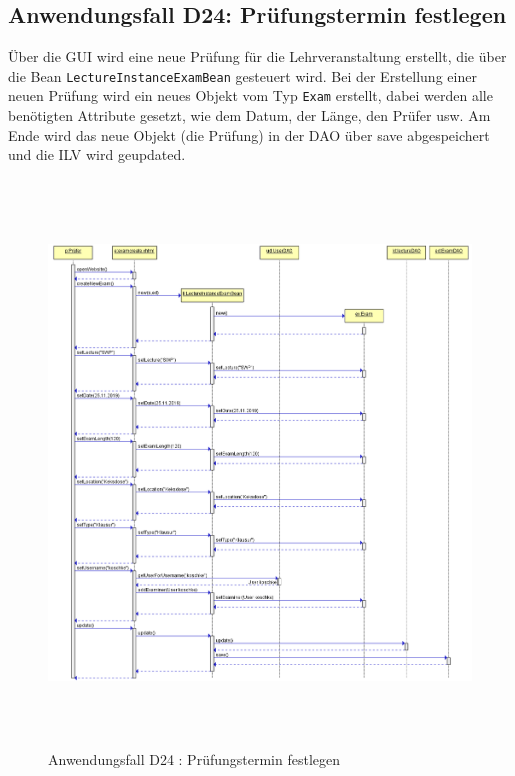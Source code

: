 \subsection{Anwendungsfall D24: Prüfungstermin festlegen}

Über die GUI wird eine neue Prüfung für die Lehrveranstaltung erstellt, die über die Bean \texttt {LectureInstanceExamBean} gesteuert wird. Bei der Erstellung einer neuen Prüfung wird ein neues Objekt vom Typ \texttt {Exam} erstellt, dabei werden alle benötigten Attribute gesetzt, wie dem Datum, der Länge, den Prüfer usw.
Am Ende wird das neue Objekt (die Prüfung) in der DAO über save abgespeichert und die ILV wird geupdated. 


\begin{figure}[H]
	\centering
	\includegraphics[width=\textwidth,height=15cm,keepaspectratio]{../UMLDiagramme/d24_pruefungstermineFestlegen.png}
	\caption{Anwendungsfall D24 : Prüfungstermin festlegen}
	\label{fig1}
\end{figure}





